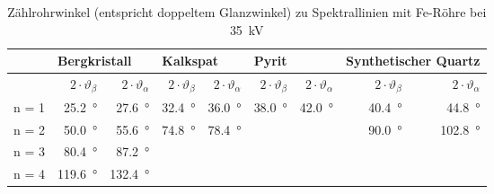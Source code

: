 \begin{table}[h!]
    \centering
    \small
    \caption{%
        Z\"ahlrohrwinkel (entspricht doppeltem  Glanzwinkel) zu Spektrallinien
        mit Fe-R\"ohre bei \SI{35}{\kilo\volt}
    }
    \label{tab:spektra:otherCrystals}
    \begin{tabular}{lrrrrrrrr}
        \toprule
        &
        \multicolumn{2}{l}{Bergkristall}         &
        \multicolumn{2}{l}{Kalkspat}             &
        \multicolumn{2}{l}{Pyrit}                &
        \multicolumn{2}{l}{Synthetischer Quartz} \\
        \midrule

        &
        $2 \cdot \vartheta_\beta$  &
        $2 \cdot \vartheta_\alpha$ &
        $2 \cdot \vartheta_\beta$  &
        $2 \cdot \vartheta_\alpha$ &
        $2 \cdot \vartheta_\beta$  &
        $2 \cdot \vartheta_\alpha$ &
        $2 \cdot \vartheta_\beta$  &
        $2 \cdot \vartheta_\alpha$ \\

        \midrule

        n = 1              &
        \SI{25.2}{\degree} &
        \SI{27.6}{\degree} &
        \SI{32.4}{\degree} &
        \SI{36.0}{\degree} &
        \SI{38.0}{\degree} &
        \SI{42.0}{\degree} &
        \SI{40.4}{\degree} &
        \SI{44.8}{\degree} \\

        n = 2               &
        \SI{ 50.0}{\degree} &
        \SI{ 55.6}{\degree} &
        \SI{ 74.8}{\degree} &
        \SI{ 78.4}{\degree} &
                            &
                            &
        \SI{ 90.0}{\degree} &
        \SI{102.8}{\degree} \\

        n = 3               &
        \SI{ 80.4}{\degree} &
        \SI{ 87.2}{\degree} &
                            &
                            &
                            &
                            &
                            &
                            \\

        n = 4               &
        \SI{119.6}{\degree} &
        \SI{132.4}{\degree} &
                            &
                            &
                            &
                            &
                            &
                            \\

        \bottomrule
    \end{tabular}
\end{table}

